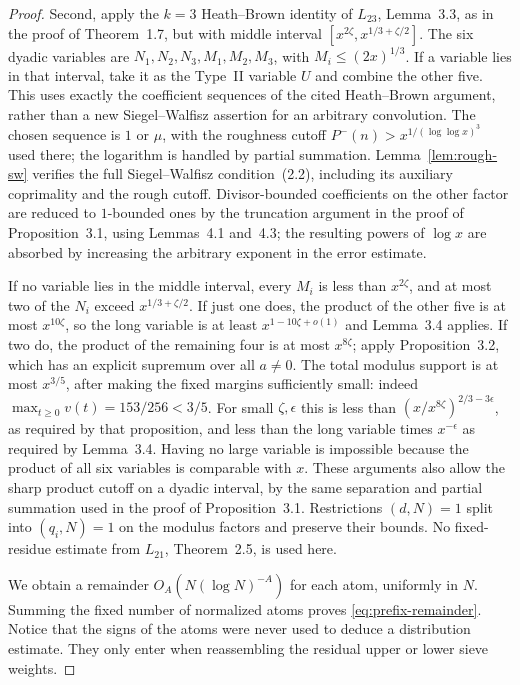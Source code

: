 \documentclass[11pt]{article}
\begin{document}
\begin{proof}
Second, apply the $k=3$ Heath--Brown identity of $L_{23}$,
Lemma~3.3, as in the proof of Theorem~1.7, but with middle interval
$[x^{2\zeta},x^{1/3+\zeta/2}]$. The six dyadic variables are
$N_1,N_2,N_3,M_1,M_2,M_3$, with $M_i\le(2x)^{1/3}$.
If a variable lies in that interval, take it as the Type~II variable
$U$ and combine the other five. This uses exactly the coefficient
sequences of the cited Heath--Brown argument, rather than a new
Siegel--Walfisz assertion for an arbitrary convolution. The chosen
sequence is $1$ or $\mu$, with the roughness cutoff
$P^-(n)>x^{1/(\log\log x)^3}$ used there; the logarithm is handled
by partial summation. Lemma~\ref{lem:rough-sw} verifies the full
Siegel--Walfisz condition~(2.2), including its auxiliary coprimality
and the rough cutoff. Divisor-bounded
coefficients on the other factor are reduced to $1$-bounded ones
by the truncation argument in the proof of Proposition~3.1, using
Lemmas~4.1 and~4.3; the resulting powers of $\log x$ are absorbed
by increasing the arbitrary exponent in the error estimate.

If no variable lies in the middle interval, every $M_i$ is less
than $x^{2\zeta}$, and at most two of the $N_i$ exceed
$x^{1/3+\zeta/2}$. If just one does, the product of the other five
is at most $x^{10\zeta}$, so the long variable is at least
$x^{1-10\zeta+o(1)}$ and Lemma~3.4 applies. If two do, the
product of the remaining four is at most $x^{8\zeta}$; apply
Proposition~3.2, which has an explicit supremum over all $a\ne0$.
The total modulus support is at most $x^{3/5}$, after making the
fixed margins sufficiently small: indeed $\max_{t\ge0}v(t)
=153/256<3/5$. For small $\zeta,\epsilon$ this is less than
$(x/x^{8\zeta})^{2/3-3\epsilon}$, as required by that proposition,
and less than the long variable times $x^{-\epsilon}$ as required
by Lemma~3.4. Having no large variable is impossible because the
product of all six variables is comparable with $x$.
These arguments also allow the sharp product cutoff on a dyadic
interval, by the same separation and partial summation used in
the proof of Proposition~3.1. Restrictions $(d,N)=1$ split into
$(q_i,N)=1$ on the modulus factors and preserve their bounds.
No fixed-residue estimate from $L_{21}$, Theorem~2.5, is used here.

We obtain a remainder $O_A(N(\log N)^{-A})$ for each atom, uniformly
in $N$. Summing the fixed number of normalized atoms proves
\eqref{eq:prefix-remainder}. Notice that the signs of the atoms were
never used to deduce a distribution estimate. They only enter when
reassembling the residual upper or lower sieve weights.


\end{proof}
\end{document}
